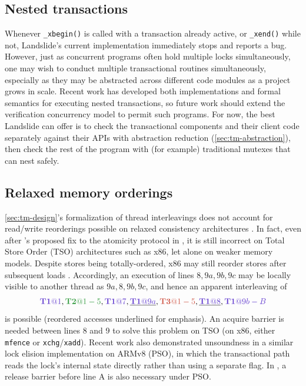 \subsection{Nested transactions}
\label{sec:tm-warpzone-nested}

Whenever {\tt \_xbegin()} is called with a transaction already active, or {\tt \_xend()} while not,
Landslide's current implementation immediately stops and reports a bug.
However, just as concurrent programs often hold multiple locks simultaneously,
one may wish to conduct multiple transactional routines simultaneously,
especially as they may be abstracted across different code modules as a project grows in scale.
Recent work \cite{hybrid-htm-stm,relaxed-transactions-popl} has developed
both implementations and formal semantics for executing nested transactions,
so future work should extend the verification concurrency model to permit such programs.
For now, the best Landslide can offer is to check the transactional components and their client code
separately against their APIs
with abstraction reduction (\cref{sec:tm-abstraction}),
then check the rest of the program with (for example) traditional mutexes that can nest safely.

\subsection{Relaxed memory orderings}
\label{sec:tm-warpzone-relaxed}

\cref{sec:tm-design}'s formalization of thread interleavings does not account for read/write reorderings
possible on relaxed consistency architectures \cite{memory-consistency-models}.
In fact,
even after \cite{tm-benchmark-cmu}'s proposed fix to the atomicity protocol in ,
it is still incorrect on Total Store Order (TSO) architectures such as x86,
let alone on weaker memory models.
Despite stores being totally-ordered, x86 may still reorder stores after subsequent loads
\cite{sully-thesis}.
Accordingly, an execution of lines $8,9a,9b,9c$
may be locally visible to another thread as $9a,8,9b,9c$,
and hence an apparent interleaving of
\[
        \tiat{1},\tjat{1-5},\tiat{7},\underline{\tiat{9a}},\tkat{1-5},\underline{\tiat{8}},\tiat{9b-B}
\]
is possible
(reordered accesses underlined for emphasis).
An acquire barrier is needed between lines 8 and 9 to solve this problem on TSO \cite{tsx-need-barrier}
(on x86, either {\tt mfence} or {\tt xchg}/{\tt xadd}).
Recent work \cite{relaxed-transactions-pldi} also demonstrated unsoundness
in a similar lock elision implementation on ARMv8 (PSO),
in which the transactional path reads the lock's internal state directly
rather than using a separate flag.
In , a release barrier before line A is also necessary under PSO.

